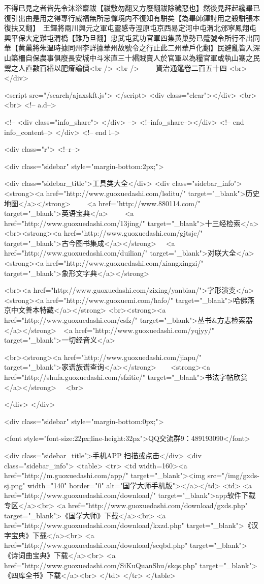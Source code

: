 不得已見之者皆先令沐浴齋祓【祓敷勿翻又方廢翻祓除穢惡也】然後見拜起纔畢已復引出由是用之得專行威福無所忌憚境内不復知有駢矣【為畢師鐸討用之殺駢張本復扶又翻】　王鐸將兩川興元之軍屯靈感寺涇原屯京西易定河中屯渭北邠寧鳳翔屯興平保大定難屯渭橋【難乃旦翻】忠武屯武功官軍四集黄巢勢已蹙號令所行不出同華【黄巢將朱温時據同州李詳據華州故號令之行止此二州華戶化翻】民避亂皆入深山築柵自保農事俱廢長安城中斗米直三十緡賊賣人於官軍以為糧官軍或執山寨之民鬻之人直數百緡以肥瘠論價<br />
<br />
　　資治通鑑卷二百五十四  <br>
   </div> 

<script src="/search/ajaxskft.js"> </script>
 <div class="clear"></div>
<br>
<br>
 <!-- a.d-->

 <!--
<div class="info_share">
</div> 
-->
 <!--info_share--></div>   <!-- end info_content-->
  </div> <!-- end l-->

<div class="r">   <!--r-->



<div class="sidebar"  style="margin-bottom:2px;">

 
<div class="sidebar_title">工具类大全</div>
<div class="sidebar_info">
<strong><a href="http://www.guoxuedashi.com/lsditu/" target="_blank">历史地图</a></strong>　　
<a href="http://www.880114.com/" target="_blank">英语宝典</a>　　
<a href="http://www.guoxuedashi.com/13jing/" target="_blank">十三经检索</a>　
<br><strong><a href="http://www.guoxuedashi.com/gjtsjc/" target="_blank">古今图书集成</a></strong>　
<a href="http://www.guoxuedashi.com/duilian/" target="_blank">对联大全</a>　<strong><a href="http://www.guoxuedashi.com/xiangxingzi/" target="_blank">象形文字典</a></strong>　

<br><a href="http://www.guoxuedashi.com/zixing/yanbian/">字形演变</a>　　<strong><a href="http://www.guoxuemi.com/hafo/" target="_blank">哈佛燕京中文善本特藏</a></strong>
<br><strong><a href="http://www.guoxuedashi.com/csfz/" target="_blank">丛书&方志检索器</a></strong>　<a href="http://www.guoxuedashi.com/yqjyy/" target="_blank">一切经音义</a>　　

<br><strong><a href="http://www.guoxuedashi.com/jiapu/" target="_blank">家谱族谱查询</a></strong>　　<strong><a href="http://shufa.guoxuedashi.com/sfzitie/" target="_blank">书法字帖欣赏</a></strong>　
<br>

</div>
</div>


<div class="sidebar" style="margin-bottom:0px;">

<font style="font-size:22px;line-height:32px">QQ交流群9：489193090</font>


<div class="sidebar_title">手机APP 扫描或点击</div>
<div class="sidebar_info">
<table>
<tr>
	<td width=160><a href="http://m.guoxuedashi.com/app/" target="_blank"><img src="/img/gxds-sj.png" width="140"  border="0" alt="国学大师手机版"></a></td>
	<td>
<a href="http://www.guoxuedashi.com/download/" target="_blank">app软件下载专区</a><br>
<a href="http://www.guoxuedashi.com/download/gxds.php" target="_blank">《国学大师》下载</a><br>
<a href="http://www.guoxuedashi.com/download/kxzd.php" target="_blank">《汉字宝典》下载</a><br>
<a href="http://www.guoxuedashi.com/download/scqbd.php" target="_blank">《诗词曲宝典》下载</a><br>
<a href="http://www.guoxuedashi.com/SiKuQuanShu/skqs.php" target="_blank">《四库全书》下载</a><br>
</td>
</tr>
</table>

